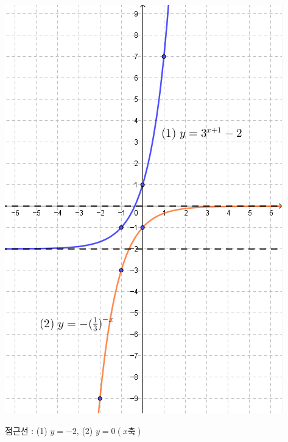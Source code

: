 \documentclass{oblivoir}
\begin{document}
\begin{multicols*}{2}
%
\begin{center}
\includegraphics[width=\columnwidth]{exp_5}
\end{center}
점근선 : (1) \(y=-2\), (2) \(y=0(x축)\)

\columnbreak
%


\end{multicols*}
\end{document}
